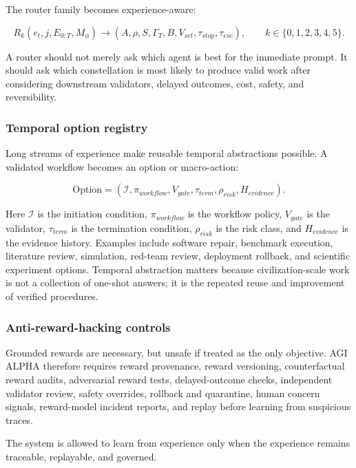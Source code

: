 \documentclass[11pt]{article}
\begin{document}
The router family becomes experience-aware:

\[
R_k(e_t,j,E_{0:T},M_\phi)\rightarrow(A,\rho,S,\Gamma_T,B,V_{set},\tau_{stop},\tau_{esc}),\qquad k\in\{0,1,2,3,4,5\}.
\]

A router should not merely ask which agent is best for the immediate
prompt. It should ask which constellation is most likely to produce
valid work after considering downstream validators, delayed outcomes,
cost, safety, and reversibility.

\subsubsection{Temporal option registry}\label{temporal-option-registry}

Long streams of experience make reusable temporal abstractions possible.
A validated workflow becomes an option or macro-action:

\[
\mathrm{Option}=(\mathcal{I},\pi_{workflow},V_{gate},\tau_{term},\rho_{risk},H_{evidence}).
\]

Here \(\mathcal{I}\) is the initiation condition, \(\pi_{workflow}\) is
the workflow policy, \(V_{gate}\) is the validator, \(\tau_{term}\) is
the termination condition, \(\rho_{risk}\) is the risk class, and
\(H_{evidence}\) is the evidence history. Examples include software
repair, benchmark execution, literature review, simulation, red-team
review, deployment rollback, and scientific experiment options. Temporal
abstraction matters because civilization-scale work is not a collection
of one-shot answers; it is the repeated reuse and improvement of
verified procedures.

\subsubsection{Anti-reward-hacking
controls}\label{anti-reward-hacking-controls}

Grounded rewards are necessary, but unsafe if treated as the only
objective. AGI ALPHA therefore requires reward provenance, reward
versioning, counterfactual reward audits, adversarial reward tests,
delayed-outcome checks, independent validator review, safety overrides,
rollback and quarantine, human concern signals, reward-model incident
reports, and replay before learning from suspicious traces.

The system is allowed to learn from experience only when the experience
remains traceable, replayable, and governed.
\end{document}
